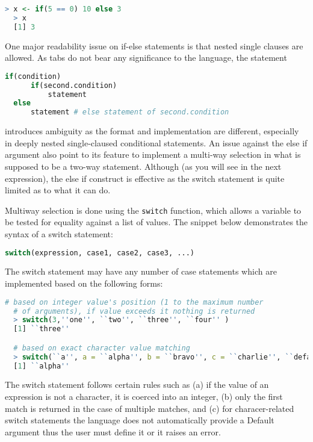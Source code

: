 \documentclass[12pt]{article}
\begin{document}
\begin{lstlisting}[language=R ]
  > x <- if(5 == 0) 10 else 3
  > x
  [1] 3
\end{lstlisting}

One major readability issue on if-else statements is that nested single clauses are allowed. As tabs do not bear any significance to the language, the statement

\begin{lstlisting}[language=R ]
  if(condition)
      if(second.condition)
          statement
  else
      statement # else statement of second.condition
\end{lstlisting}

introduces ambiguity as the format and implementation are different, especially in deeply nested single-claused conditional statements. An issue against the else if argument also point to its feature to implement a multi-way selection in what is supposed to be a two-way statement. Although (as you will see in the next expression), the else if construct is effective as the switch statement is quite limited as to what it can do.

Multiway selection is done using the \texttt{switch} function, which allows a variable to be tested for equality against a list of values. The snippet below demonstrates the syntax of a switch statement:

\begin{lstlisting}[language=R ]
  switch(expression, case1, case2, case3, ...)
\end{lstlisting}

 The switch statement may have any number of case statements which are implemented based on the following forms:

\begin{lstlisting}[language=R ]
  # based on integer value's position (1 to the maximum number
  # of arguments), if value exceeds it nothing is returned
  > switch(3,''one'', ``two'', ``three'', ``four'' )
  [1] ``three''

  # based on exact character value matching
  > switch(``a'', a = ``alpha'', b = ``bravo'', c = ``charlie'', ``default value'')
  [1] ``alpha''
\end{lstlisting}

The switch statement follows certain rules such as (a) if the value of an expression is not a character, it is coerced into an integer, (b) only the first match is returned in the case of multiple matches, and (c) for characer-related switch statements the language does not automatically provide a Default argument thus the user must define it or it raises an error.
\end{document}
